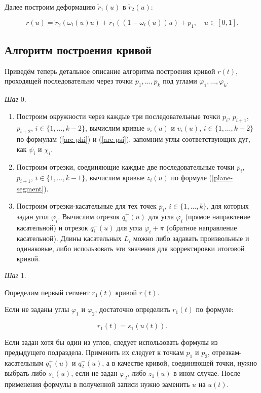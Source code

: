 Далее построим деформацию $\tilde r_1(u)$ в $\tilde r_2(u)$:

\begin{equation}
r(u)=\tilde r_2(\omega_l(u)u)+\tilde r_1((1-\omega_l(u))u)+p_1, \quad u \in [0,1].
\label{plane-result-deformed-curve}
\end{equation}

\subsection*{Алгоритм построения кривой}

Приведём теперь детальное описание алгоритма построения кривой $r(t)$, проходящей последовательно через точки
$p_1,\dots,p_k$ под углами $\varphi_1,\dots,\varphi_k$.

\bigskip
\textit{Шаг} 0.

\begin{enumerate}
\item Построим окружности через каждые три последовательные точки $p_i$, $p_{i+1}$, $p_{i+2}$, $i \in \{1,\dots,k-2\}$,
вычислим кривые $s_i(u)$ и $v_i(u)$, $i \in \{1,\dots,k-2\}$ по формулам (\ref{arc-phi}) и (\ref{arc-psi}), запомним
углы соответствующих дуг, как $\psi_i$ и $\chi_i$.
\item Построим отрезки, соединяющие каждые две последовательные точки $p_i$, $p_{i+1}$, $i \in \{1,\dots,k-1\}$,
вычислим кривые $z_i(u)$ по формуле (\ref{plane-segment}).
\item Построим отрезки-касательные для тех точек $p_i$, $i \in \{1,\dots,k\}$, для которых задан угол $\varphi_i$.
Вычислим отрезок $q_i^+(u)$ для угла $\varphi_i$ (прямое направление касательной) и отрезок $q_i^-(u)$ для угла
$\varphi_i+\pi$ (обратное направление касательной). Длины касательных $L_i$ можно либо задавать произвольные и одинаковые,
либо использовать эти значения для корректировки итоговой кривой.
\end{enumerate}

\bigskip
\textit{Шаг} 1.

Определим первый сегмент $r_1(t)$ кривой $r(t)$.

Если не заданы углы $\varphi_1$ и $\varphi_2$, достаточно определить $r_1(t)$ по формуле:

$$
r_1(t)=s_1(u(t)).
$$

Если задан хотя бы один из углов, следует использовать формулы из предыдущего подраздела. Применить их следует к
точкам $p_1$ и $p_2$, отрезкам-касательным $q_1^+(u)$ и $q_2^-(u)$, а в качестве кривой, соединяющей точки, нужно
выбрать либо $s_1(u)$, если не задан $\varphi_2$, либо $z_1(u)$ в ином случае. После применения формулы в полученной
записи нужно заменить $u$ на $u(t)$.

